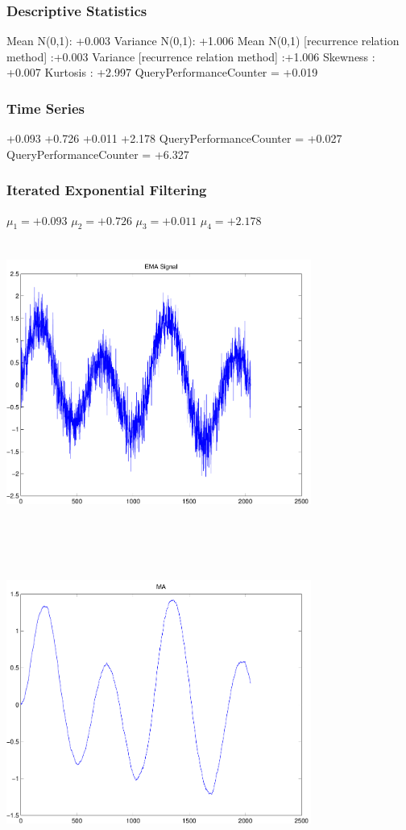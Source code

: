\documentclass[9pt]{article}
\theoremstyle{plain}
\theoremstyle{definition}
\theoremstyle{remark}
\numberwithin{equation}{section}
\begin{document}
\subsubsection{Descriptive Statistics}
Mean N(0,1): +0.003
Variance N(0,1): +1.006
Mean N(0,1) [recurrence relation method] :+0.003
Variance [recurrence relation method] :+1.006
Skewness : +0.007
Kurtosis : +2.997
QueryPerformanceCounter  =  +0.019
\subsubsection{Time Series }
+0.093
+0.726
+0.011
+2.178
QueryPerformanceCounter  =  +0.027
QueryPerformanceCounter  =  +6.327
\subsubsection{Iterated Exponential Filtering }
$\mu_1 =+0.093$
$\mu_2 =+0.726$
$\mu_3 =+0.011$
$\mu_4 =+2.178$
\includegraphics[width=10.0cm,height=10.0cm]{EMA_signal.pdf}

\includegraphics[width=10.0cm,height=10.0cm]{MA.pdf}
\end{document}
